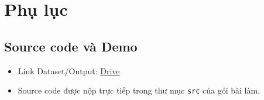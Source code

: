 \section{Phụ lục}


\subsection{Source code và Demo}
\begin{itemize}
    \item Link Dataset/Output: \href{https://drive.google.com/drive/folders/106v6y8GMyYHtOZLone474yRZgOjSoNSC?usp=sharing}{Drive}
    \item Source code được nộp trực tiếp trong thư mục \texttt{src} của gói bài làm.
\end{itemize}
